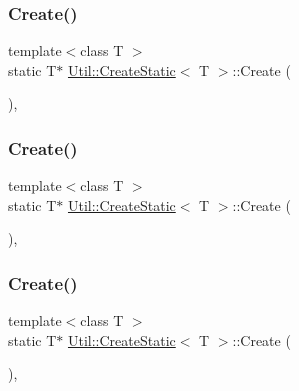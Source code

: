 \subsubsection{\texorpdfstring{Create()}{Create()}\hspace{0.1cm}{\footnotesize\ttfamily [1/3]}}
{\footnotesize\ttfamily template$<$class T $>$ \\
static T$\ast$ \mbox{\hyperlink{structUtil_1_1CreateStatic}{Util\+::\+Create\+Static}}$<$ T $>$\+::Create (\begin{DoxyParamCaption}{ }\end{DoxyParamCaption})\hspace{0.3cm}{\ttfamily [inline]}, {\ttfamily [static]}}

\mbox{\label{structUtil_1_1CreateStatic_ab48b58ee24bd7bb78e5a66753c392e25}} 
\subsubsection{\texorpdfstring{Create()}{Create()}\hspace{0.1cm}{\footnotesize\ttfamily [2/3]}}
{\footnotesize\ttfamily template$<$class T $>$ \\
static T$\ast$ \mbox{\hyperlink{structUtil_1_1CreateStatic}{Util\+::\+Create\+Static}}$<$ T $>$\+::Create (\begin{DoxyParamCaption}{ }\end{DoxyParamCaption})\hspace{0.3cm}{\ttfamily [inline]}, {\ttfamily [static]}}

\mbox{\label{structUtil_1_1CreateStatic_ab48b58ee24bd7bb78e5a66753c392e25}} 
\subsubsection{\texorpdfstring{Create()}{Create()}\hspace{0.1cm}{\footnotesize\ttfamily [3/3]}}
{\footnotesize\ttfamily template$<$class T $>$ \\
static T$\ast$ \mbox{\hyperlink{structUtil_1_1CreateStatic}{Util\+::\+Create\+Static}}$<$ T $>$\+::Create (\begin{DoxyParamCaption}{ }\end{DoxyParamCaption})\hspace{0.3cm}{\ttfamily [inline]}, {\ttfamily [static]}}

